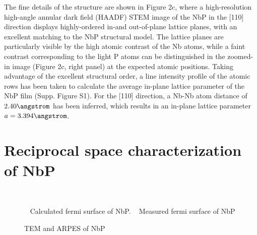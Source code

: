 The fine details of the structure are shown in Figure 2c, where a high-resolution 
high-angle annular dark field (HAADF) STEM image of the NbP in the [110] direction 
displays highly-ordered in-and out-of-plane lattice planes, with an excellent matching
to the NbP structural model.  The lattice planes are particularly visible by the high 
atomic contrast of the Nb atoms, while a faint contrast corresponding to the light P 
atoms can be distinguished in the zoomed-in image (Figure 2c, right panel) at the 
expected atomic positions. Taking advantage of the excellent structural order, a line 
intensity profile of the atomic rows has been taken to calculate the average in-plane 
lattice parameter of the NbP film (Supp. Figure S1). For the [110] direction, a Nb-Nb 
atom distance of $2.40 \angstrom$ has been inferred, which results in an in-plane lattice parameter 
$a=3.394 \angstrom$.  

\section{Reciprocal space characterization of NbP}

\begin{figure}
    \centering
    \\
    \caption{
        \sfA~ Calculated fermi surface of NbP.
        \sfB~ Measured fermi surface of NbP
    }
\end{figure}

\begin{figure}
    \centering

    
    \caption{
       TEM and ARPES of NbP
    }
\end{figure}

